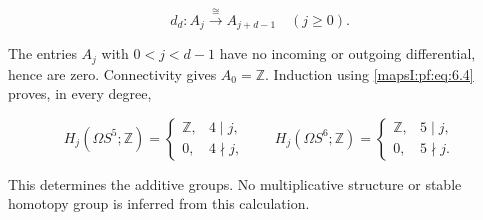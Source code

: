 \begin{equation}
d_d:A_j\xrightarrow{\ \cong\ }A_{j+d-1}\quad(j\geq0).
\label{mapsI:pf:eq:6.4}
\end{equation}

The entries \(A_j\) with \(0<j<d-1\) have no incoming or outgoing differential, hence are zero. Connectivity gives \(A_0=\mathbb Z\). Induction using \eqref{mapsI:pf:eq:6.4} proves, in every degree,

\begin{equation}
H_j(\Omega S^5;\mathbb Z)=
\begin{cases}\mathbb Z,&4\mid j,\\0,&4\nmid j,\end{cases}
\qquad
H_j(\Omega S^6;\mathbb Z)=
\begin{cases}\mathbb Z,&5\mid j,\\0,&5\nmid j.\end{cases}
\label{mapsI:pf:eq:6.5}
\end{equation}

This determines the additive groups. No multiplicative structure or stable homotopy group is inferred from this calculation.
